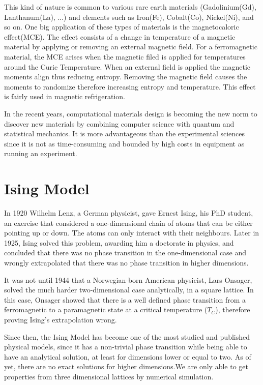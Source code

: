 This kind of nature is common to various rare earth materials (Gadolinium(Gd), Lanthanum(La), ...) and elements such as Iron(Fe), Cobalt(Co), Nickel(Ni), and so on. One big application of these types of materials is the magnetocaloric effect(MCE). The effect consists of a change in temperature of a magnetic material by applying or removing an external magnetic field. For a ferromagnetic material, the MCE arises when the magnetic filed is applied for temperatures around the Curie Temperature. When an external field is applied the magnetic moments align thus reducing entropy. Removing the magnetic field causes the moments to randomize therefore increasing entropy and temperature. This effect is fairly used in magnetic refrigeration.

In the recent years, computational materials design is becoming the new norm to discover new materials by combining computer science with quantum and statistical mechanics. It is more advantageous than the experimental sciences since it is not as time-consuming and bounded by high costs in equipment as running an experiment\cite{Chen2019, Curtarolo2013}. 

\section{Ising Model}

In 1920 Wilhelm Lenz, a German physicist, gave Ernest Ising, his PhD student, an exercise that considered a one-dimensional chain of atoms that can be either pointing up or down. The atoms can only interact with their neighbours. Later in 1925, Ising solved this problem, awarding him a doctorate in physics,  and concluded that there was no phase transition in the one-dimensional case and wrongly extrapolated that there was no phase transition in higher dimensions.\cite{Ising1925}

It was not until 1944 that a Norwegian-born American physicist, Lars Onsager, solved the much harder two-dimensional case analytically, in a square lattice\cite{Onsager1944}. In this case, Onsager showed that there is a well defined phase transition from a ferromagnetic to a paramagnetic state at a critical temperature ($T_C$), therefore proving Ising's extrapolation wrong.

Since then, the Ising Model has become one of the most studied and published physical models, since it has a non-trivial phase transition while being able to have an analytical solution, at least for dimensions lower or equal to two. As of yet, there are no exact solutions for higher dimensions.We are only able to get properties from three dimensional lattices by numerical simulation.

